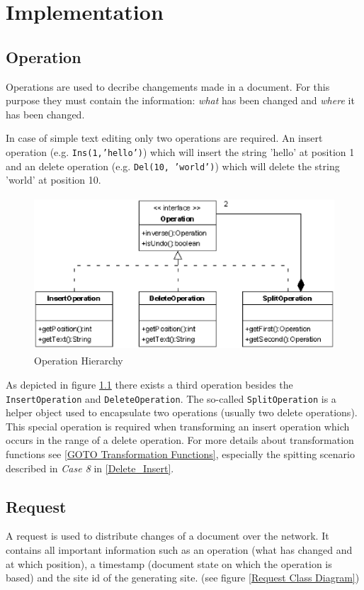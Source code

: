 
\chapter{Implementation}

\section{Operation}
Operations are used to decribe changements made in a document. For this purpose they must contain the information: \emph{what} has been changed and \emph{where} it has been changed.

In case of simple text editing only two operations are required. An insert operation (e.g. \texttt{Ins(1,'hello')}) which will insert the string 'hello' at position 1 and an delete operation (e.g. \texttt{Del(10, 'world')}) which will delete the string 'world' at position 10.

\begin{figure}[H]
\centering
\includegraphics[height=5.74cm,width=11.59cm]{../../images/algo-impl/operation_classdiagram.eps}
\caption{Operation Hierarchy}
\label{Operation Hierarchy}
\end{figure}

\label{Split_Operation}
As depicted in figure \ref{Operation Hierarchy} there exists a third operation besides the \texttt{InsertOperation} and \texttt{DeleteOperation}. The so-called \texttt{SplitOperation} is a helper object used to encapsulate two operations (usually two delete operations). This special operation is required when transforming an insert operation which occurs in the range of a delete operation. For more details about transformation functions see \ref{GOTO Transformation Functions}, especially the spitting scenario described in \emph{Case 8} in \ref{Delete_Insert}.

\section{Request}
A request is used to distribute changes of a document over the network. It contains all important information such as an operation (what has changed and at which position), a timestamp (document state on which the operation is based) and the site id of the generating site. (see figure \ref{Request Class Diagram})

